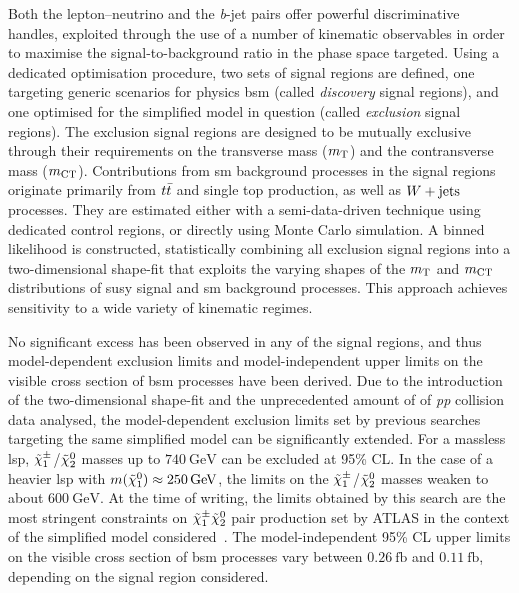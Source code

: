 Both the lepton--neutrino and the \textit{b}-jet pairs offer powerful discriminative handles, exploited through the use of a number of kinematic observables in order to maximise the signal-to-background ratio in the phase space targeted.
Using a dedicated optimisation procedure, two sets of signal regions are defined, one targeting generic scenarios for physics \gls{bsm} (called \textit{discovery} signal regions), and one optimised for the simplified model in question (called \textit{exclusion} signal regions). 
The exclusion signal regions are designed to be mutually exclusive through their requirements on the transverse mass ($m_{\textrm{T}}$) and the contransverse mass ($m_{\textrm{CT}}$).
Contributions from \gls{sm} background processes in the signal regions originate primarily from $t\bar{t}$ and single top production, as well as $W+\mathrm{jets}$ processes. They are estimated either with a semi-data-driven technique using dedicated control regions, or directly using Monte Carlo simulation.
A binned likelihood is constructed, statistically combining all exclusion signal regions into a two-dimensional shape-fit that exploits the varying shapes of the $m_{\textrm{T}}$ and $m_{\textrm{CT}}$ distributions of \gls{susy} signal and \gls{sm} background processes. This approach achieves sensitivity to a wide variety of kinematic regimes.

No significant excess has been observed in any of the signal regions, and thus model-dependent exclusion limits and model-independent upper limits on the visible cross section of \gls{bsm} processes have been derived.
Due to the introduction of the two-dimensional shape-fit and the unprecedented amount of \onethirtynineifb of \textit{pp} collision data analysed, the model-dependent exclusion limits set by previous searches targeting the same simplified model can be significantly extended.
For a massless \gls{lsp}, \mbox{$\tilde{\chi}_1^\pm$/$\tilde{\chi}_2^0$} masses up to $\SI{740}{\GeV}$ can be excluded at 95\% CL. In the case of a heavier \gls{lsp} with $m(\lsp)\approx\SI{250}{\GeV}$, the limits on the \mbox{$\tilde{\chi}_1^\pm$/$\tilde{\chi}_2^0$} masses weaken to about $\SI{600}{\GeV}$.
At the time of writing, the limits obtained by this search are the most stringent constraints on $\tilde{\chi}_1^\pm\tilde{\chi}_2^0$ pair production set by ATLAS in the context of the simplified model considered~\cite{ATL-PHYS-PUB-2021-007}.
The model-independent 95\% CL upper limits on the visible cross section of \gls{bsm} processes vary between $\SI{0.26}{\femto\barn}$ and $\SI{0.11}{\femto\barn}$, depending on the signal region considered. 

